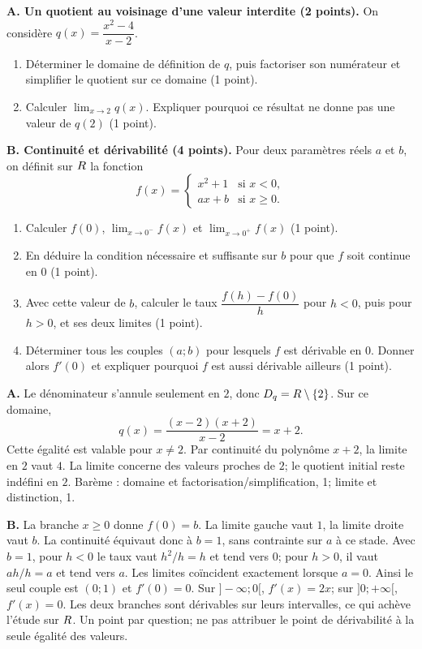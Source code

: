 \label{t11s-ds1-e01}\par
\textbf{A. Un quotient au voisinage d’une valeur interdite (2 points).}
On considère $q(x)=\dfrac{x^2-4}{x-2}$.
\begin{enumerate}
\item Déterminer le domaine de définition de $q$, puis factoriser son numérateur et simplifier le quotient sur ce domaine (1 point).
\item Calculer $\lim_{x\to2}q(x)$. Expliquer pourquoi ce résultat ne donne pas une valeur de $q(2)$ (1 point).
\end{enumerate}
\textbf{B. Continuité et dérivabilité (4 points).}
Pour deux paramètres réels $a$ et $b$, on définit sur $R$ la fonction
\[
f(x)=\begin{cases}x^2+1&\text{si }x<0,\\ax+b&\text{si }x\ge0.\end{cases}
\]
\begin{enumerate}
\item Calculer $f(0)$, $\lim_{x\to0^-}f(x)$ et $\lim_{x\to0^+}f(x)$ (1 point).
\item En déduire la condition nécessaire et suffisante sur $b$ pour que $f$ soit continue en $0$ (1 point).
\item Avec cette valeur de $b$, calculer le taux $\dfrac{f(h)-f(0)}h$ pour $h<0$, puis pour $h>0$, et ses deux limites (1 point).
\item Déterminer tous les couples $(a;b)$ pour lesquels $f$ est dérivable en $0$. Donner alors $f'(0)$ et expliquer pourquoi $f$ est aussi dérivable ailleurs (1 point).
\end{enumerate}
\begin{corrige}\label{sol-t11s-ds1-e01}
\textbf{A.} Le dénominateur s’annule seulement en $2$, donc $D_q=R\setminus\{2\}$. Sur ce domaine,
\[
q(x)=\frac{(x-2)(x+2)}{x-2}=x+2.
\]
Cette égalité est valable pour $x\ne2$. Par continuité du polynôme $x+2$, la limite en $2$ vaut $4$. La limite concerne des valeurs proches de $2$; le quotient initial reste indéfini en $2$. Barème : domaine et factorisation/simplification, 1; limite et distinction, 1.

\textbf{B.} La branche $x\ge0$ donne $f(0)=b$. La limite gauche vaut $1$, la limite droite vaut $b$. La continuité équivaut donc à $b=1$, sans contrainte sur $a$ à ce stade.
Avec $b=1$, pour $h<0$ le taux vaut $h^2/h=h$ et tend vers $0$; pour $h>0$, il vaut $ah/h=a$ et tend vers $a$. Les limites coïncident exactement lorsque $a=0$. Ainsi le seul couple est $(0;1)$ et $f'(0)=0$. Sur $]-\infty;0[$, $f'(x)=2x$; sur $]0;+\infty[$, $f'(x)=0$. Les deux branches sont dérivables sur leurs intervalles, ce qui achève l’étude sur $R$. Un point par question; ne pas attribuer le point de dérivabilité à la seule égalité des valeurs.
\end{corrige}

